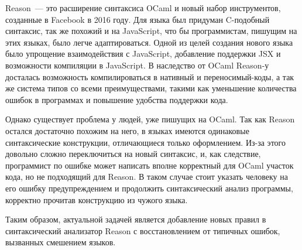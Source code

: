 Reason~--- это расширение синтаксиса OCaml и новый набор инструментов, созданные в Facebook в 2016 году. Для языка был придуман C-подобный синтаксис, так же похожий и на JavaScript, что бы программистам, пишущим на этих языках, было легче адаптироваться\cite{RE}. Одной из целей создания нового языка было упрощение взаимодействия с JavaScript, добавление поддержки JSX и возможности компиляции в JavaScript\cite{WE}. В наследство от OCaml Reason-у досталась возможность компилироваться в нативный и переносимый-коды, а так же система типов со всеми преимуществами, такими как уменьшение количества ошибок в программах и повышение удобства поддержки кода.

Однако существует проблема у людей, уже пишущих на OCaml. Так как Reason остался достаточно похожим на него, в языках имеются одинаковые синтаксические конструкции, отличающиеся только оформлением. Из-за этого довольно сложно переключиться на новый синтаксис, и, как следствие, программист по ошибке может написать вполне корректный для OCaml участок кода, но не подходящий для Reason. В таком случае стоит указать человеку на его ошибку предупреждением и продолжить синтаксический анализ программы, корректно прочитав конструкцию из чужого языка.

Таким образом, актуальной задачей является добавление новых правил в синтаксический анализатор Reason с восстановлением от типичных ошибок, вызванных смешением языков.
